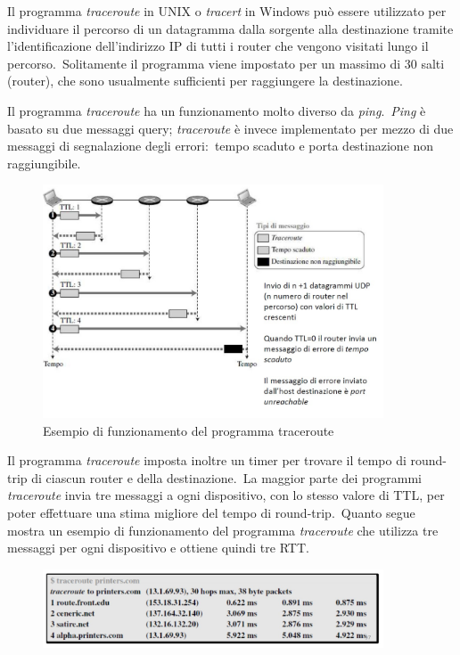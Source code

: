 Il programma \emph{traceroute} in UNIX o \emph{tracert} in Windows può essere utilizzato per individuare il percorso di un datagramma dalla sorgente alla destinazione tramite l’identificazione dell’indirizzo IP di tutti i router che vengono visitati lungo il percorso.\
Solitamente il programma viene impostato per un massimo di 30 salti (router), che sono usualmente sufficienti per raggiungere la destinazione.

Il programma \emph{traceroute} ha un funzionamento molto diverso da \emph{ping}.\
\emph{Ping} è basato su due messaggi query; \emph{traceroute} è invece implementato per mezzo di due messaggi di segnalazione degli errori:\ tempo scaduto e porta destinazione non raggiungibile.

\begin{figure}[H]
    \centering
    \includegraphics[width=0.9\textwidth]{immagini/Traceroute.jpg}
    \caption*{Esempio di funzionamento del programma traceroute}
\end{figure}

Il programma \emph{traceroute} imposta inoltre un timer per trovare il tempo di round-trip di ciascun router e della destinazione.\
La maggior parte dei programmi \emph{traceroute} invia tre messaggi a ogni dispositivo, con lo stesso valore di TTL, per poter effettuare una stima migliore del tempo di round-trip.\
Quanto segue mostra un esempio di funzionamento del programma \emph{traceroute} che utilizza tre messaggi per ogni dispositivo e ottiene quindi tre RTT.

\begin{figure}[H]
    \centering
    \includegraphics[width=0.9\textwidth]{immagini/Traceroute_RTT.jpg}
\end{figure}


